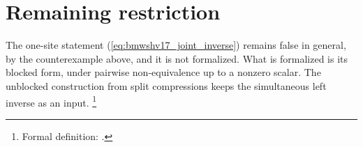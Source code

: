 \documentclass{article}
\begin{document}
\section{Remaining restriction}
The one-site statement (\ref{eq:bmwshv17_joint_inverse}) remains false in
general, by the counterexample above, and it is not formalized. What is
formalized is its blocked form, under pairwise non-equivalence up to a nonzero
scalar. The unblocked construction from split compressions keeps the
simultaneous left inverse as an input.
\footnote{Formal definition:
    .}



\end{document}
